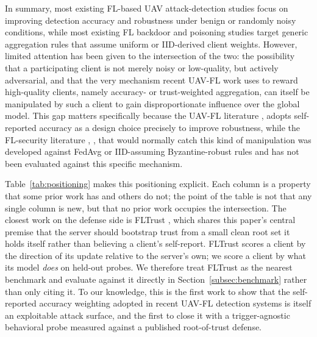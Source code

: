 \documentclass[journal]{IEEEtran}
\begin{document}
In summary, most existing FL-based UAV attack-detection studies focus on improving detection accuracy and robustness under benign or randomly noisy conditions, while most existing FL backdoor and poisoning studies target generic aggregation rules that assume uniform or IID-derived client weights. However, limited attention has been given to the intersection of the two: the possibility that a participating client is not merely noisy or low-quality, but actively adversarial, and that the very mechanism recent UAV-FL work uses to reward high-quality clients, namely accuracy- or trust-weighted aggregation, can itself be manipulated by such a client to gain disproportionate influence over the global model. This gap matters specifically because the UAV-FL literature \cite{chai2025navigation}, \cite{udin2025federated} adopts self-reported accuracy as a design choice precisely to improve robustness, while the FL-security literature \cite{bagdasaryan2020backdoor}, \cite{fang2020local}, \cite{cao2021fltrust} that would normally catch this kind of manipulation was developed against FedAvg or IID-assuming Byzantine-robust rules and has not been evaluated against this specific mechanism.

Table~\ref{tab:positioning} makes this positioning explicit. Each column is a property that some prior work has and others do not; the point of the table is not that any single column is new, but that no prior work occupies the intersection. The closest work on the defense side is FLTrust \cite{cao2021fltrust}, which shares this paper's central premise that the server should bootstrap trust from a small clean root set it holds itself rather than believing a client's self-report. FLTrust scores a client by the direction of its update relative to the server's own; we score a client by what its model \emph{does} on held-out probes. We therefore treat FLTrust as the nearest benchmark and evaluate against it directly in Section~\ref{subsec:benchmark} rather than only citing it. To our knowledge, this is the first work to show that the self-reported accuracy weighting adopted in recent UAV-FL detection systems is itself an exploitable attack surface, and the first to close it with a trigger-agnostic behavioral probe measured against a published root-of-trust defense.
\end{document}
